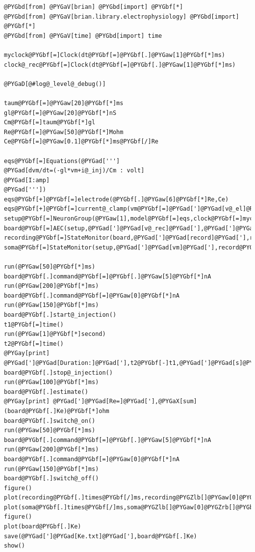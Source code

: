 \documentclass[letterpaper,10pt,english]{manual}
\begin{document}
\begin{Verbatim}[commandchars=@\[\]]
@PYGbd[from] @PYGaV[brian] @PYGbd[import] @PYGbf[*]
@PYGbd[from] @PYGaV[brian.library.electrophysiology] @PYGbd[import] @PYGbf[*]
@PYGbd[from] @PYGaV[time] @PYGbd[import] time

myclock@PYGbf[=]Clock(dt@PYGbf[=]@PYGbf[.]@PYGaw[1]@PYGbf[*]ms)
clock@_rec@PYGbf[=]Clock(dt@PYGbf[=]@PYGbf[.]@PYGaw[1]@PYGbf[*]ms)

@PYGaD[@#log@_level@_debug()]

taum@PYGbf[=]@PYGaw[20]@PYGbf[*]ms
gl@PYGbf[=]@PYGaw[20]@PYGbf[*]nS
Cm@PYGbf[=]taum@PYGbf[*]gl
Re@PYGbf[=]@PYGaw[50]@PYGbf[*]Mohm
Ce@PYGbf[=]@PYGaw[0.1]@PYGbf[*]ms@PYGbf[/]Re

eqs@PYGbf[=]Equations(@PYGad[''']
@PYGad[dvm/dt=(-gl*vm+i@_inj)/Cm : volt]
@PYGad[I:amp]
@PYGad['''])
eqs@PYGbf[+]@PYGbf[=]electrode(@PYGbf[.]@PYGaw[6]@PYGbf[*]Re,Ce)
eqs@PYGbf[+]@PYGbf[=]current@_clamp(vm@PYGbf[=]@PYGad[']@PYGad[v@_el]@PYGad['],i@_inj@PYGbf[=]@PYGad[']@PYGad[i@_cmd]@PYGad['],i@_cmd@PYGbf[=]@PYGad[']@PYGad[I]@PYGad['],Re@PYGbf[=]@PYGbf[.]@PYGaw[4]@PYGbf[*]Re,Ce@PYGbf[=]Ce)
setup@PYGbf[=]NeuronGroup(@PYGaw[1],model@PYGbf[=]eqs,clock@PYGbf[=]myclock)
board@PYGbf[=]AEC(setup,@PYGad[']@PYGad[v@_rec]@PYGad['],@PYGad[']@PYGad[I]@PYGad['],clock@_rec)
recording@PYGbf[=]StateMonitor(board,@PYGad[']@PYGad[record]@PYGad['],record@PYGbf[=]@PYGaA[True],clock@PYGbf[=]myclock)
soma@PYGbf[=]StateMonitor(setup,@PYGad[']@PYGad[vm]@PYGad['],record@PYGbf[=]@PYGaA[True],clock@PYGbf[=]myclock)

run(@PYGaw[50]@PYGbf[*]ms)
board@PYGbf[.]command@PYGbf[=]@PYGbf[.]@PYGaw[5]@PYGbf[*]nA
run(@PYGaw[200]@PYGbf[*]ms)
board@PYGbf[.]command@PYGbf[=]@PYGaw[0]@PYGbf[*]nA
run(@PYGaw[150]@PYGbf[*]ms)
board@PYGbf[.]start@_injection()
t1@PYGbf[=]time()
run(@PYGaw[1]@PYGbf[*]second)
t2@PYGbf[=]time()
@PYGay[print] @PYGad[']@PYGad[Duration:]@PYGad['],t2@PYGbf[-]t1,@PYGad[']@PYGad[s]@PYGad[']
board@PYGbf[.]stop@_injection()
run(@PYGaw[100]@PYGbf[*]ms)
board@PYGbf[.]estimate()
@PYGay[print] @PYGad[']@PYGad[Re=]@PYGad['],@PYGaX[sum](board@PYGbf[.]Ke)@PYGbf[*]ohm
board@PYGbf[.]switch@_on()
run(@PYGaw[50]@PYGbf[*]ms)
board@PYGbf[.]command@PYGbf[=]@PYGbf[.]@PYGaw[5]@PYGbf[*]nA
run(@PYGaw[200]@PYGbf[*]ms)
board@PYGbf[.]command@PYGbf[=]@PYGaw[0]@PYGbf[*]nA
run(@PYGaw[150]@PYGbf[*]ms)
board@PYGbf[.]switch@_off()
figure()
plot(recording@PYGbf[.]times@PYGbf[/]ms,recording@PYGZlb[]@PYGaw[0]@PYGZrb[]@PYGbf[/]mV,@PYGad[']@PYGad[b]@PYGad['])
plot(soma@PYGbf[.]times@PYGbf[/]ms,soma@PYGZlb[]@PYGaw[0]@PYGZrb[]@PYGbf[/]mV,@PYGad[']@PYGad[r]@PYGad['])
figure()
plot(board@PYGbf[.]Ke)
save(@PYGad[']@PYGad[Ke.txt]@PYGad['],board@PYGbf[.]Ke)
show()
\end{Verbatim}
\end{document}

